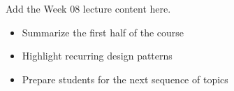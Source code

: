 Add the Week 08 lecture content here.

\begin{itemize}
  \item Summarize the first half of the course
  \item Highlight recurring design patterns
  \item Prepare students for the next sequence of topics
\end{itemize}
